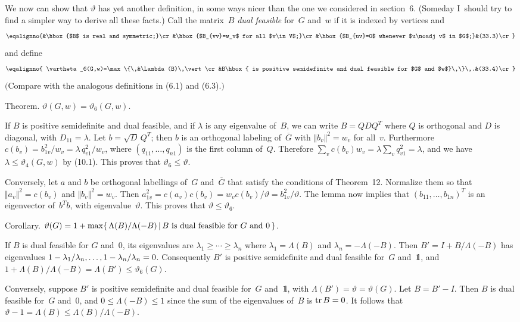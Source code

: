 \medskip
We now can show that $\vartheta$ has yet another definition, in some ways nicer
than the one we considered in section~6. (Someday I~should try to find a
simpler way to derive all these facts.) Call the matrix~$B$ {\it dual
feasible\/} for~$G$ and~$w$ if it is indexed by vertices and
$$\eqalignno{&\hbox{$B$ is real and symmetric;}\cr
&\hbox{$B_{vv}=w_v$ for all $v\in V$;}\cr
&\hbox{$B_{uv}=0$ whenever $u\noadj v$ in $G$;}&(33.3)\cr}$$
and define
$$\eqalignno{
\vartheta_6(G,w)=\max\{\,&\Lambda(B)\,\vert\cr
&B\hbox{ is positive semidefinite and
dual feasible for $G$ and $w$}\,\}\,.&(33.4)\cr}$$%
$\bigl($Compare with the analogous definitions in (6.1) and (6.3).$\bigr)$

\proclaim
Theorem. $\vartheta(G,w)=\vartheta_6(G,w)$.

\quad
If $B$ is positive semidefinite and dual feasible, and if $\lambda$ is any
eigenvalue of~$B$, we can write $B=QDQ^T$ where $Q$ is orthogonal and $D$ is
diagonal, with $D_{11}=\lambda$. Let $b=\sqrt{D}\,Q^T$; then $b$ is an
orthogonal labeling of~$\overline{G}$ with $\Vert b_v\Vert^2=w_v$ for all~$v$.
Furthermore $c(b_v)=b^2_{1v}/w_v=\lambda\,q^2_{v1}/w_v$, where
$(q_{11},\ldots,q_{n1})$ is the first column of~$Q$. Therefore $\sum_v
c(b_v)w_v=\lambda\sum_v q^2_{v1}=\lambda$, and we have $\lambda \leq
\vartheta_4(G,w)$ by (10.1). This proves that $\vartheta_6\leq \vartheta$. 

Conversely, let $a$ and $b$ be orthogonal labellings of~$G$ and~$\overline{G}$
that satisfy the conditions of Theorem~12. Normalize them so that $\Vert
a_v\Vert^2=c(b_v)$ and $\Vert b_v\Vert^2=w_v$. Then $a^2_{1v}=c(a_v)c(b_v)=
w_vc(b_v)/\vartheta=b^2_{1v}/\vartheta$. The lemma now implies that
$(b_{11},\ldots,b_{1n})^T$ is an eigenvector of~$b^Tb$, with
eigenvalue~$\vartheta$. This proves that $\vartheta\leq \vartheta_6$. \ \pfbox

\proclaim
Corollary. $\vartheta(G)=1+\max\{\,\Lambda(B)/\Lambda(-B)
\,\vert\, B\hbox{ is dual feasible for $G$ and 0}\,\}$.

\quad
If $B$ is dual feasible for $G$ and~0, its eigenvalues are $\lambda_1\geq
\cdots\geq \lambda_n$ where $\lambda_1=\Lambda(B)$ and
$\lambda_n=-\Lambda(-B)$. Then $B'=I+B/\Lambda(-B)$ has eigenvalues
$1-\lambda_1/\lambda_n,\ldots,\break
1-\lambda_n/\lambda_n=0$. Consequently $B'$ is
positive semidefinite and dual feasible for~$G$ and~${1\mskip-4.5mu\rm l}$, and
$1+\Lambda(B)/\Lambda(-B)=\Lambda(B')\leq \vartheta_6(G)$.

Conversely, suppose $B'$ is positive semidefinite and dual feasible for~$G$
and~${1\mskip-4.5mu\rm l}$, with $\Lambda(B')=\vartheta=\vartheta(G)$. Let $B=B'-I$. Then $B$
is dual feasible for~$G$ and~0, and $0\leq\Lambda(-B)\leq 1$ since the sum of
the eigenvalues of~$B$ is $\mathop{\rm tr} B=0$. 
It follows that $\vartheta -1=\Lambda(B) \leq\Lambda(B)/\Lambda(-B)$. \ \pfbox

